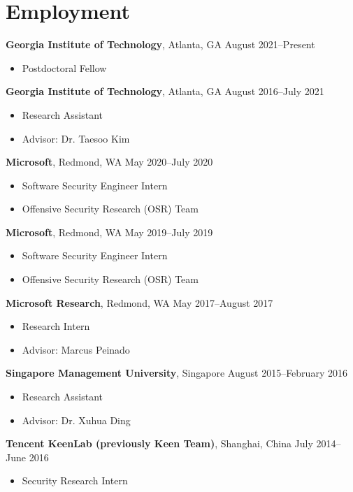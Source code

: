 \section*{Employment}

\begin{description}
\item {\bf Georgia Institute of Technology}, Atlanta, GA
\dotfill August 2021--Present
  \begin{itemize}
  \item Postdoctoral Fellow
  \end{itemize}

\item {\bf Georgia Institute of Technology}, Atlanta, GA
\dotfill August 2016--July 2021
  \begin{itemize}
  \item Research Assistant
  \item Advisor: Dr. Taesoo Kim
  \end{itemize}

 \item {\bf Microsoft}, Redmond, WA \dotfill May 2020--July 2020
  \begin{itemize}
  \item Software Security Engineer Intern
  \item Offensive Security Research (OSR) Team
  \end{itemize}

 \item {\bf Microsoft}, Redmond, WA \dotfill May 2019--July 2019
  \begin{itemize}
  \item Software Security Engineer Intern
  \item Offensive Security Research (OSR) Team
  \end{itemize}
 
\item {\bf Microsoft Research}, Redmond, WA \dotfill May 2017--August 2017
  \begin{itemize}
  \item Research Intern
  \item Advisor: Marcus Peinado
  \end{itemize}

\item {\bf Singapore Management University}, Singapore \dotfill August 2015--February 2016
  \begin{itemize}
  \item Research Assistant
  \item Advisor: Dr. Xuhua Ding
  \end{itemize}

\item {\bf Tencent KeenLab (previously Keen Team)}, Shanghai, China \dotfill July 2014--June 2016
	\begin{itemize}
	\item Security Research Intern
	\end{itemize}
\end{description}
